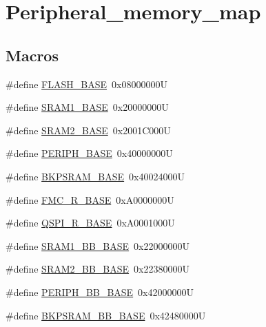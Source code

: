 \hypertarget{group___peripheral__memory__map}{}\section{Peripheral\+\_\+memory\+\_\+map}
\label{group___peripheral__memory__map}
\subsection*{Macros}
\begin{DoxyCompactItemize}
\item 
\#define \mbox{\hyperlink{group___peripheral__memory__map_ga23a9099a5f8fc9c6e253c0eecb2be8db}{F\+L\+A\+S\+H\+\_\+\+B\+A\+SE}}~0x08000000U
\item 
\#define \mbox{\hyperlink{group___peripheral__memory__map_ga7d0fbfb8894012dbbb96754b95e562cd}{S\+R\+A\+M1\+\_\+\+B\+A\+SE}}~0x20000000U
\item 
\#define \mbox{\hyperlink{group___peripheral__memory__map_gadbb42a3d0a8a90a79d2146e4014241b1}{S\+R\+A\+M2\+\_\+\+B\+A\+SE}}~0x2001\+C000U
\item 
\#define \mbox{\hyperlink{group___peripheral__memory__map_ga9171f49478fa86d932f89e78e73b88b0}{P\+E\+R\+I\+P\+H\+\_\+\+B\+A\+SE}}~0x40000000U
\item 
\#define \mbox{\hyperlink{group___peripheral__memory__map_ga52e57051bdf8909222b36e5408a48f32}{B\+K\+P\+S\+R\+A\+M\+\_\+\+B\+A\+SE}}~0x40024000U
\item 
\#define \mbox{\hyperlink{group___peripheral__memory__map_ga7a599164cd92798542bc6288793d1ed5}{F\+M\+C\+\_\+\+R\+\_\+\+B\+A\+SE}}~0x\+A0000000U
\item 
\#define \mbox{\hyperlink{group___peripheral__memory__map_ga3b6b7d9c67dec50557fd634505198e9d}{Q\+S\+P\+I\+\_\+\+R\+\_\+\+B\+A\+SE}}~0x\+A0001000U
\item 
\#define \mbox{\hyperlink{group___peripheral__memory__map_gac4c4f61082e4b168f29d9cf97dc3ca5c}{S\+R\+A\+M1\+\_\+\+B\+B\+\_\+\+B\+A\+SE}}~0x22000000U
\item 
\#define \mbox{\hyperlink{group___peripheral__memory__map_gac33cb6edadf184ab9860d77089503922}{S\+R\+A\+M2\+\_\+\+B\+B\+\_\+\+B\+A\+SE}}~0x22380000U
\item 
\#define \mbox{\hyperlink{group___peripheral__memory__map_gaed7efc100877000845c236ccdc9e144a}{P\+E\+R\+I\+P\+H\+\_\+\+B\+B\+\_\+\+B\+A\+SE}}~0x42000000U
\item 
\#define \mbox{\hyperlink{group___peripheral__memory__map_gaee19a30c9fa326bb10b547e4eaf4e250}{B\+K\+P\+S\+R\+A\+M\+\_\+\+B\+B\+\_\+\+B\+A\+SE}}~0x42480000U

\end{DoxyCompactItemize}
